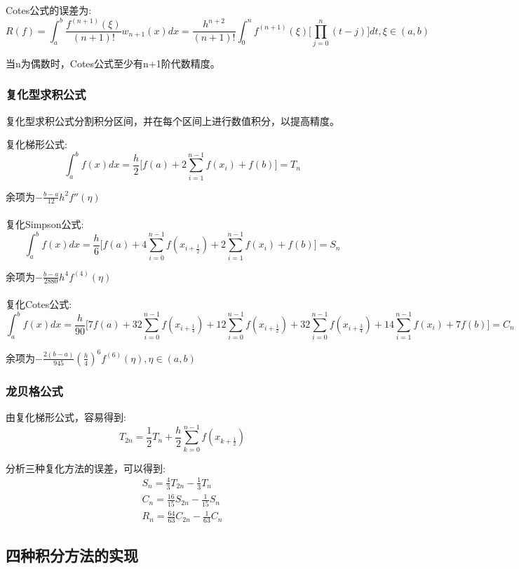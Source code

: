 \documentclass{article}
\begin{document}
Cotes公式的误差为: $$R(f)=\int_a^b\frac{f^{(n+1)}(\xi)}{(n+1)!}w_{n+1}(x)dx=\frac{h^{n+2}}{(n+1)!}\int_0^nf^{(n+1)}(\xi)\Big[\prod\limits_{j=0}^n(t-j)\Big]dt, \xi\in(a,b)$$

当n为偶数时，Cotes公式至少有n+1阶代数精度。

		\subsubsection{复化型求积公式}
复化型求积公式分割积分区间，并在每个区间上进行数值积分，以提高精度。

复化梯形公式: $$\int_a^bf(x)dx=\frac{h}{2}\Big[f(a)+2\sum\limits_{i=1}^{n-1}f(x_i)+f(b)\Big]=T_n$$

余项为$-\frac{b-a}{12}h^2f''(\eta)$\\
\\

复化Simpson公式: $$\int_a^bf(x)dx=\frac{h}{6}\Big[f(a)+4\sum\limits_{i=0}^{n-1}f(x_{i+\frac{1}{2}})+2\sum\limits_{i=1}^{n-1}f(x_i)+f(b)\Big]=S_n$$

余项为$-\frac{b-a}{2880}h^4f^{(4)}(\eta)$\\
\\

复化Cotes公式: $$\int_a^bf(x)dx=\frac{h}{90}\Big[7f(a)+32\sum\limits_{i=0}^{n-1}f(x_{i+\frac{1}{4}})+12\sum\limits_{i=0}^{n-1}f(x_{i+\frac{1}{2}})+32\sum\limits_{i=0}^{n-1}f(x_{i+\frac{3}{4}})+14\sum\limits_{i=1}^{n-1}f(x_i)+7f(b)\Big]=C_n$$

余项为$-\frac{2(b-a)}{945}(\frac{h}{4})^6f^{(6)}(\eta), \eta\in(a,b)$

		\subsubsection{龙贝格公式}

由复化梯形公式，容易得到:$$T_{2n}=\frac{1}{2}T_n+\frac{h}{2}\sum\limits_{k=0}^{n-1}f(x_{k+\frac{1}{2}})$$

分析三种复化方法的误差，可以得到: 
$$
\begin{aligned}
S_n=\frac{4}{3}T_{2n}-\frac{1}{3}T_n\\
C_n=\frac{16}{15}S_{2n}-\frac{1}{15}S_n\\
R_n=\frac{64}{63}C_{2n}-\frac{1}{63}C_n
\end{aligned}
$$

	\subsection{四种积分方法的实现}
\end{document}
